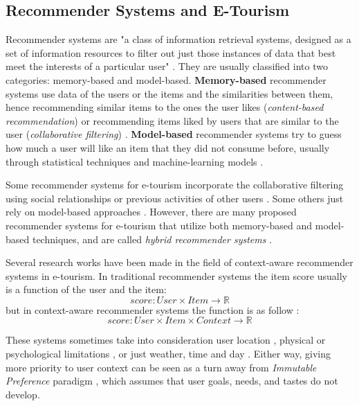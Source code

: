 \subsection{Recommender Systems and E-Tourism} \label{section:recommender-systems}
Recommender systems are "a class of information retrieval systems, designed as a set of information resources to filter out just those instances of data that best meet the interests of a particular user" \cite{artemenko2017tourism}. They are usually classified into two categories: memory-based and model-based. \textbf{Memory-based} recommender systems use data of the users or the items and the similarities between them, hence recommending similar items to the ones the user likes (\textit{content-based recommendation}) or recommending items liked by users that are similar to the user (\textit{collaborative filtering}) \cite{ebrahim_2012}. \textbf{Model-based} recommender systems try to guess how much a user will like an item that they did not consume before, usually through statistical techniques and machine-learning models \cite{ebrahim_2012}. 

Some recommender systems for e-tourism incorporate the collaborative filtering using social relationships \cite{christensen2016social} \cite{kesorn2017personalized} or previous activities of other users \cite{rajaonarivo2019recommendation}. Some others just rely on model-based approaches \cite{sun2019building}. However, there are many proposed recommender systems for e-tourism that utilize both memory-based and model-based techniques, and are called \textit{hybrid recommender systems} \cite{logesh2019exploring}\cite{logesh2019efficient}. 

Several research works have been made in the field of context-aware recommender systems in e-tourism. In traditional recommender systems the item score usually is a function of the user and the item:
\begin{equation}
    score: User \times Item \rightarrow \mathbb{R}
\end{equation}
but in context-aware recommender systems the function is as follow \cite{artemenko2017tourism}:
\begin{equation}
    score: User  \times Item \times Context \rightarrow \mathbb{R}
\end{equation}

These systems sometimes take into consideration user location \cite{logesh2018personalised},  physical or psychological limitations \cite{santos2019using}, or just weather, time and day \cite{bahramian_abbaspour_claramunt_2017}. Either way, giving more priority to user context can be seen as a turn away from \textit{Immutable Preference} paradigm \cite{pagano2016contextual}, which assumes that user goals, needs, and tastes do not develop.

